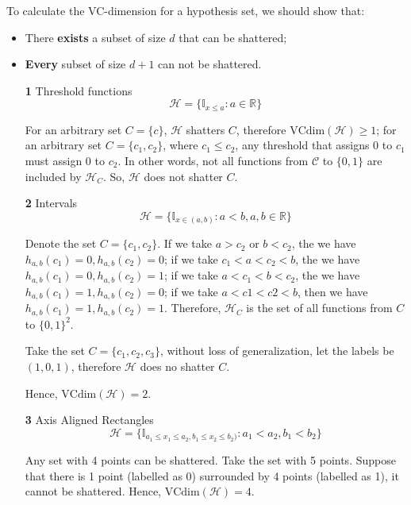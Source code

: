 \documentclass{article}
\begin{document}
	To calculate the VC-dimension for a hypothesis set, we should show that:
	\begin{itemize}
	\item There \textbf{exists} a subset of size $d$ that can be shattered;
	\item \textbf{Every} subset of size $d+1$ can not be shattered.
	\end{itemize}
	
	\begin{itemize}
	\item [\textbf{1}] Threshold functions
		\begin{equation*}
		\mathcal{H}=\{\mathbb{I}_{x\leq a}:a\in\mathbb{R}\}
		\end{equation*}
		
	For an arbitrary set $C=\{c\}$, $\mathcal{H}$ shatters $C$, therefore $\mathrm{VCdim}(\mathcal{H})\geq 1$; for an arbitrary set $C=\{c_1,c_2\}$, where $c_1\leq c_2$, any threshold that assigns 0 to $c_1$ must assign 0 to $c_2$. In other words, not all functions from $\mathcal{C}$ to $\{0,1\}$ are included by $\mathcal{H}_C$. So, $\mathcal{H}$ does not shatter $C$.
	
	\item [\textbf{2}] Intervals
		\begin{equation*}
		\mathcal{H}=\{\mathbb{I}_{x\in(a,b)}:a<b,a,b\in\mathbb{R}\}
		\end{equation*}
	
	Denote the set $C=\{c_1, c_2\}$. If we take $a>c_2$ or $b<c_2$, the we have $h_{a,b}(c_1)=0, h_{a,b}(c_2)=0$; if we take $c_1<a<c_2<b$, the we have $h_{a,b}(c_1)=0, h_{a,b}(c_2)=1$; if we take $a<c_1<b<c_2$, the we have $h_{a,b}(c_1)=1, h_{a,b}(c_2)=0$; if we take $a<c1<c2<b$, then we have $h_{a,b}(c_1)=1, h_{a,b}(c_2)=1$. Therefore, $\mathcal{H}_C$ is the set of all functions from $C$ to $\{0,1\}^2$.
		
	Take the set $C=\{c_1,c_2,c_3\}$, without loss of generalization, let the labels be  $(1,0,1)$, therefore $\mathcal{H}$ does no shatter $C$.
	
	Hence, $\mathrm{VCdim}(\mathcal{H})=2$.
	
	\item [\textbf{3}] Axis Aligned Rectangles
		\begin{equation*}
		\mathcal{H}=\{\mathbb{I}_{a_1\leq x_1\leq a_2,b_1\leq x_2\leq b_2)}:a_1<a_2,b_1<b_2\}
		\end{equation*}
	
	Any set with 4 points can be shattered. Take the set with 5 points. Suppose that there is 1 point (labelled as 0) surrounded by 4 points (labelled as 1), it cannot be shattered. Hence, $\mathrm{VCdim}(\mathcal{H})=4$.
	

\end{itemize}
\end{document}
